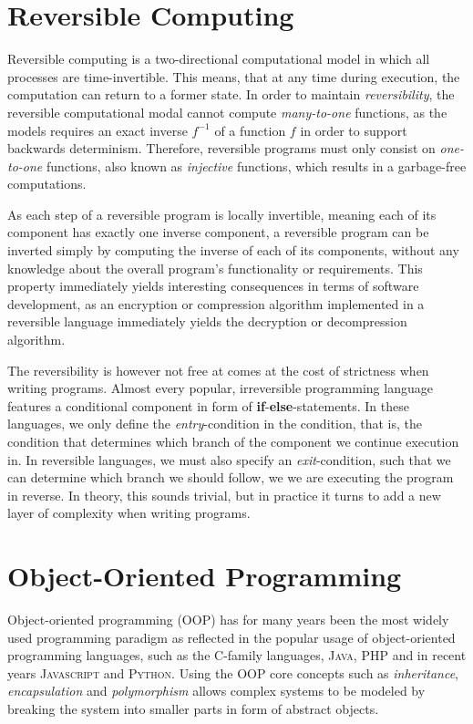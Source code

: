 \section{Reversible Computing}
\label{sec:reversible-computing}
Reversible computing is a two-directional computational model in which all processes are time-invertible. This means, that at any time during execution, the computation can return to a former state. In order to maintain \textit{reversibility}, the reversible computational modal cannot compute \textit{many-to-one} functions, as the models requires an exact inverse $f^{-1}$ of a function $f$ in order to support backwards determinism. Therefore, reversible programs must only consist on \textit{one-to-one} functions, also known as \textit{injective} functions, which results in a garbage-free computations.

As each step of a reversible program is locally invertible, meaning each of its component has exactly one inverse component, a reversible program can be inverted simply by computing the inverse of each of its components, without any knowledge about the overall program's functionality or requirements. This property immediately yields interesting consequences in terms of software development, as an encryption or compression algorithm implemented in a reversible language immediately yields the decryption or decompression algorithm.

The reversibility is however not free at comes at the cost of strictness when writing programs. Almost every popular, irreversible programming language features a conditional component in form of \textbf{if}-\textbf{else}-statements. In these languages, we only define the \textit{entry}-condition in the condition, that is, the condition that determines which branch of the component we continue execution in. In reversible languages, we must also specify an \textit{exit}-condition, such that we can determine which branch we should follow, we we are executing the program in reverse. In theory, this sounds trivial, but in practice it turns to add a new layer of complexity when writing programs.


\section{Object-Oriented Programming}
\label{sec:object-oriented-programming}
Object-oriented programming (OOP) has for many years been the most widely used programming paradigm as reflected in the popular usage of object-oriented programming languages, such as the \textsc{C}-family languages, \textsc{Java}, \textsc{PHP} and in recent years \textsc{Javascript} and \textsc{Python}. Using the OOP core concepts such as \textit{inheritance}, \textit{encapsulation} and \textit{polymorphism} allows complex systems to be modeled by breaking the system into smaller parts in form of abstract objects. 



